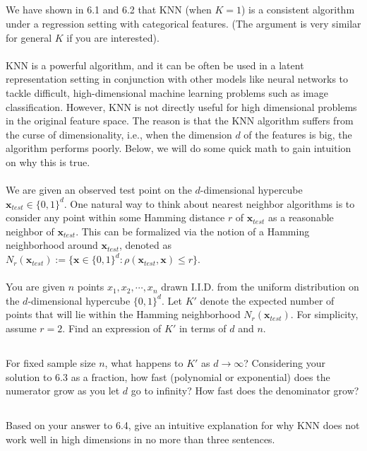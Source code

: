 \documentclass{exam}
\begin{document}
\subsection{}
We have shown in 6.1 and 6.2 that KNN (when $K = 1$) is a consistent algorithm under a regression setting with categorical features. (The argument is very similar for general $K$ if you are interested). 
\\\\KNN is a powerful algorithm, and it can be often be used in a latent representation setting in conjunction with other models like neural networks to tackle difficult, high-dimensional machine learning problems such as image classification. However, KNN is not directly useful for high dimensional problems in the original feature space. The reason is that the KNN algorithm suffers from the curse of dimensionality, i.e., when the dimension $d$ of the features is big, the algorithm performs poorly. Below, we will do some quick math to gain intuition on why this is true. \\\\
We are given an observed test point on the $d$-dimensional hypercube $\textbf{x}_{test} \in \{0,1\}^d$. One natural way to think about nearest neighbor algorithms is to consider any point within some Hamming distance $r$ of $\textbf{x}_{test}$ as a reasonable neighbor of $\textbf{x}_{test}$. This can be formalized via the notion of a Hamming neighborhood around $\textbf{x}_{test}$, denoted as $N_r(\textbf{x}_{test}):=\{\textbf{x} \in \{0, 1\}^d : \rho(\textbf{x}_{test}, \textbf{x}) \leq r\}$.
\\\\
You are given $n$ points $x_1, x_2, \cdots, x_n$ drawn I.I.D. from the uniform distribution on the $d$-dimensional hypercube $\{0,1\}^d$. Let $K'$ denote the expected number of points that will lie within the Hamming neighborhood $N_r(\textbf{x}_{test})$. For simplicity, assume $r = 2$. Find an expression of $K'$ in terms of $d$ and $n$. 

\subsection{}
For fixed sample size $n$, what happens to $K'$ as $d \to \infty$? Considering your solution to 6.3 as a fraction, how fast (polynomial or exponential) does the numerator grow as you let $d$ go to infinity? How fast does the denominator grow?  

\subsection{}
Based on your answer to 6.4, give an intuitive explanation for why KNN does not work well in high dimensions in no more than three sentences. 
\end{document}
